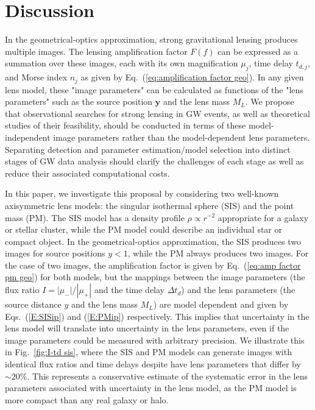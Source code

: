 \documentclass[floats,floatfix,showpacs,amssymb,prd,twocolumn,superscriptaddress,nofootinbib,nolongbibliography,reprint]{revtex4-2}
\renewcommand{\vec}[1]{\mathbf{#1}}
\begin{document}
 
\section{\label{sec:Conclusion}Discussion}

In the geometrical-optics approximation, strong gravitational lensing produces multiple images. The lensing amplification factor $F(f)$ can be expressed as a summation over these images, each with its own magnification $\mu_j$, time delay $t_{d,j}$, and Morse index $n_j$ as given by Eq.~(\ref{eq:amplification factor geo}). In any given lens model, these "image parameters" can be calculated as functions of the "lens parameters" such as the source position $\vec{y}$ and the lens mass $M_L$.  We propose that observational searches for strong lensing in GW events, as well as theoretical studies of their feasibility, should be conducted in terms of these model-independent image parameters rather than the model-dependent lens parameters.  Separating detection and parameter estimation/model selection into distinct stages of GW data analysis should clarify the challenges of each stage as well as reduce their associated computational costs.

In this paper, we investigate this proposal by considering two well-known axisymmetric lens models: the singular isothermal sphere (SIS) and the point mass (PM). The SIS model has a density profile $\rho \propto r^{-2}$ appropriate for a galaxy or stellar cluster, while the PM model could describe an individual star or compact object.  In the geometrical-optics approximation, the SIS produces two images for source positions $y < 1$, while the PM always produces two images. For the case of two images, the amplification factor is given by Eq.~(\ref{eq:amp factor pm geo}) for both models, but the mappings between the image parameters (the flux ratio $I = |\mu_-|/|\mu_+|$ and the time delay $\Delta t_d$) and the lens parameters (the source distance $y$ and the lens mass $M_L$) are model dependent and given by Eqs.~(\ref{E:SISip}) and (\ref{E:PMip}) respectively.  This implies that uncertainty in the lens model will translate into uncertainty in the lens parameters, even if the image parameters could be measured with arbitrary precision.  We illustrate this in Fig.~\ref{fig:I-td sis}, where the SIS and PM models can generate images with identical flux ratios and time delays despite have lens parameters that differ by $\sim20\%$.  This represents a conservative estimate of the systematic error in the lens parameters associated with uncertainty in the lens model, as the PM model is more compact than any real galaxy or halo.
\end{document}
